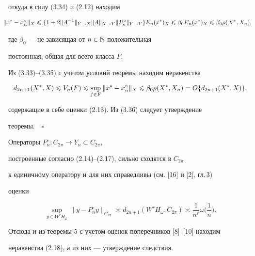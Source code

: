 откуда в силу (3.34) и (2.12) находим


\begin{equation}


\hspace*{-3mm}


\|x^* - x_n^\circ\|_X \lea \{1+2\|A^{-1}\|_{Y\to X}\|A\|_{X\to


Y}\|P_n^\circ\|_{Y\to Y}\} E_n(x^*)_X \lea


\beta_0 E_n(x^*)_X \lea \beta_0 \rho(X^*,X_n),


\end{equation}


где $\beta_0$ --- не зависящая от $n\in\Bbb {N}$ положительная


постоянная, общая для всего класса $F$.





Из (3.33)--(3.35) с учетом условий теоремы находим неравенства


\begin{equation}


d_{2n+1}(X^*,X) \lea V_n(F) \lea \sup\limits_{f\in F}\|x^* -


x^\circ_n\|_X \lea \beta_0 \rho(X^*,X_n) =


O\{d_{2n+1}(X^*,X)\},


\end{equation}


содержащие в себе оценки (2.13). Из (3.36) следует утверждение


теоремы.$\quad\square$





Операторы $P_n^\circ:C_{2\pi}\to Y_n \subset C_{2\pi}$,


построенные согласно (2.14)--(2.17), сильно сходятся в $C_{2\pi}$


к единичному оператору и для них справедливы (см. [16] и [2], гл.\,3)


оценки


$$


\sup\limits_{y\in W^rH_\omega}\|y - P_n^\circ y\|_{C_{2\pi}}


\asymp d_{2n+1}(W^rH_\omega,


C_{2\pi})\asymp\frac{1}{n^r}\omega\bigg(\frac{1}{n}\bigg).


$$


Отсюда и из теоремы 5 с учетом оценок поперечников [8]--[10] находим


неравенства (2.18), а из них --- утверждение следствия.


